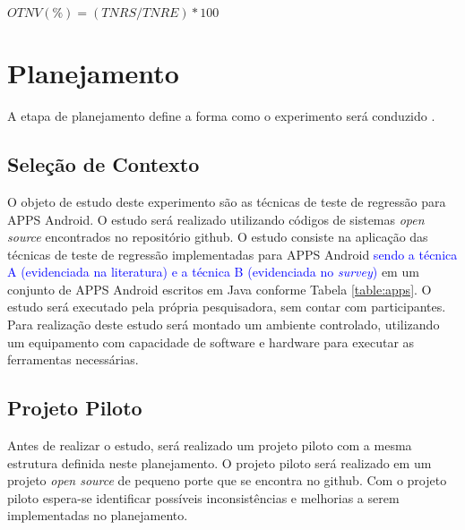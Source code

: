 \begin{itemize}
\begin{enumerate}[label=\bf M\arabic*,leftmargin=2.1cm]
\begin{center}
{{\begin{center}
                \textbf{$OTNV (\%) = ({TNRS}/{TNRE})*100$}
    
                \end{center}
            }
        }
        \end{center}
        
   
    \end{enumerate}

    



\end{itemize}   

\section{Planejamento}\label{sec:planejamentodoexperimentope}

A etapa de planejamento define a forma como o experimento será conduzido \cite{Wohlin:2012:ESE:2349018}.

\subsection{Seleção de Contexto}

O objeto de estudo deste experimento são as técnicas de teste de regressão para \ac{APPS} Android. O estudo será realizado utilizando códigos de sistemas \textit{open source} encontrados no repositório github.  O estudo consiste na aplicação das técnicas de teste de regressão implementadas para \ac{APPS} Android \textcolor{blue}{sendo a técnica A (evidenciada na literatura) e a técnica B (evidenciada no \textit{survey})} em um conjunto de \ac{APPS} Android escritos em Java conforme Tabela \ref{table:apps}. O estudo será executado pela própria pesquisadora, sem contar com participantes. Para realização deste estudo será montado um ambiente controlado, utilizando um equipamento com capacidade de software e hardware para executar as ferramentas necessárias. 


\subsection{Projeto Piloto}

Antes de realizar o estudo, será realizado um projeto piloto com a mesma estrutura definida neste planejamento. O projeto piloto será realizado em um projeto \textit{open source} de pequeno porte que se encontra no github. Com o projeto piloto espera-se identificar possíveis inconsistências e melhorias a serem implementadas no planejamento.

